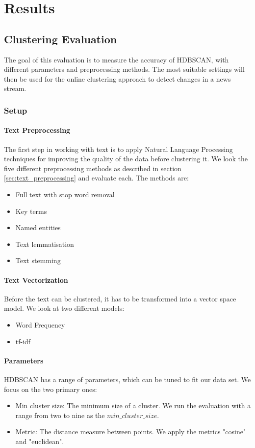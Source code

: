 \section{Results}

\subsection{Clustering Evaluation}

The goal of this evaluation is to measure the accuracy of HDBSCAN, with different parameters and preprocessing methods. The most suitable settings will then be used for the online clustering approach to detect changes in a news stream.

\subsubsection{Setup}

\paragraph{Text Preprocessing}

 The first step in working with text is to apply Natural Language Processing techniques for improving the quality of the data before clustering it. We look the five different preprocessing methods as described in section \ref{sec:text_preprocessing} and evaluate each. The methods are:
 \begin{itemize}
     \item Full text with stop word removal
     \item Key terms
     \item Named entities
     \item Text lemmatisation
     \item Text stemming
 \end{itemize} 

\paragraph{Text Vectorization} Before the text can be clustered, it has to be transformed into a vector space model. We look at two different models:
\begin{itemize}
    \item Word Frequency
    \item tf-idf
\end{itemize}

\paragraph{Parameters} HDBSCAN has a range of parameters, which can be tuned to fit our data set. We focus on the two primary ones:
\begin{itemize}
    \item Min cluster size: The minimum size of a cluster. We run the evaluation with a range from two to nine as the $min\_cluster\_size$. 
    \item Metric: The distance measure between points. We apply the metrics "cosine" and "euclidean". 
\end{itemize}

